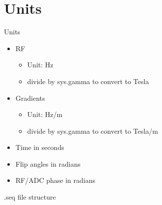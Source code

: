 \documentclass{beamer}
\begin{document}
\section{Units}
\begin{frame}{Units}

\begin{itemize}
    \item RF
        \begin{itemize}
        \item Unit: Hz
        \item divide by sys.gamma to convert to Tesla
        \end{itemize}
    \item Gradients
        \begin{itemize}
        \item Unit: Hz/m
        \item divide by sys.gamma to convert to Tesla/m
        \end{itemize}
    \item Time in seconds
    \item Flip angles in radians
    \item RF/ADC phase in radians
\end{itemize}


\end{frame}


\begin{frame}{.seq file structure}

\end{frame}

\end{document}
